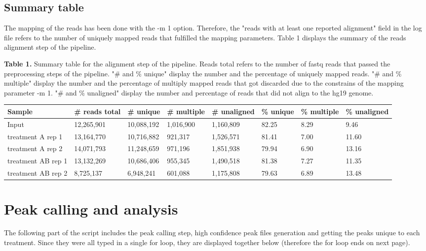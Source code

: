 \documentclass[a4paper,11pt]{article}
\begin{document}
\subsection{Summary table}

\noindent The mapping of the reads has been done with the -m 1 option. Therefore, the "reads with at least one reported alignment" field in the log file refers to the number of uniquely mapped reads that fulfilled the mapping parameters. Table 1 displays the summary of the reads alignment step of the pipeline.\\

\footnotesize

\textbf{Table 1.} Summary table for the alignment step of the pipeline. Reads total refers to the number of fastq reads that passed the preprocessing steps of the pipeline. "\# and \% unique" display the number and the percentage of uniquely mapped reads. "\# and \% multiple" display the number and the percentage of multiply mapped reads that got discarded due to the constrains of the mapping parameter -m 1. "\# and \% unaligned" display the number and percentage of reads that did not align to the hg19 genome.
\begin{flushright}
\begin{tabular}{|p{1.6cm}|p{1.8cm}|p{1.8cm}|p{1.8cm}|p{1.8cm}|p{1.2cm}|p{1.2cm}|p{1.2cm}|}
 \hline 
 Sample & \# reads total & \# unique & \# multiple & \# unaligned & \% unique & \% multiple & \% unaligned \\ 
 \hline 
 Input & 12,265,901 & 10,088,192 & 1,016,900 & 1,160,809 & 82.25 & 8.29 & 9.46 \\ 
 \hline 
 treatment A rep 1 & 13,164,770 & 10,716,882 & 921,317 & 1,526,571 & 81.41 & 7.00 & 11.60 \\ 
 \hline 
 treatment A rep 2 & 14,071,793 & 11,248,659 & 971,196 & 1,851,938 & 79.94 & 6.90 & 13.16 \\ 
 \hline 
 treatment AB rep 1 & 13,132,269 & 10,686,406 & 955,345 & 1,490,518 & 81.38 & 7.27 & 11.35 \\ 
 \hline 
 treatment AB rep 2 & 8,725,137 & 6,948,241 & 601,088 & 1,175,808 & 79.63 & 6.89 & 13.48 \\ 
 \hline 
 \end{tabular}  

\end{flushright} 
 \normalsize

\pagebreak

\section{Peak calling and analysis}
\noindent The following part of the script includes the peak calling step, high confidence peak files generation and getting the peaks unique to each treatment. Since they were all typed in a single for loop, they are displayed together below (therefore the for loop ends on next page).
\end{document}
